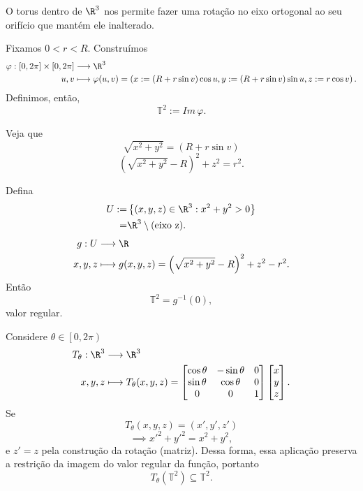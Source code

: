\begin{eg}
    O torus dentro de $\R^{3}$ nos permite fazer uma rotação no eixo ortogonal ao seu orifício que mantém ele inalterado.

    Fixamos $0<r<R$. Construímos
    \begin{align*}
        \varphi : \left[ 0, 2\pi \right] \times \left[ 0,2\pi \right]  &\longrightarrow \R^{3} \\
	u,v &\longmapsto \varphi (u,v) = \left( x:=(R + r\sin v)\cos u, y:=\left( R+r\sin v \right) \sin u,z:= r\cos v \right) 
    .\end{align*}
    Definimos, então, \[
    \mathbb{T}^2 := Im\, \varphi 
    .\] 

    Veja que \[
    \sqrt{ x^2+y^2} = \left( R+r\sin v \right)
    \] \[
    \left( \sqrt{ x^2+y^2} - R \right)^2 + z^2  = r^2
    .\] 

    Defina
    \begin{align*}
	U :=& \left\{ \left( x,y,z \right) \in \R^{3}: x^2+y^2 > 0 \right\} \\
	=& \R^{3}\setminus \text{(eixo z)}
    .\end{align*}
    \begin{align*}
        g: U &\longrightarrow \R \\
        x,y,z &\longmapsto g(x,y,z) = \left( \sqrt{ x^2+y^2} - R \right)^2 + z^2  - r^2
    .\end{align*}
    Então \[
    \mathbb{T}^2 = g^{-1}\left( 0 \right) 
    ,\] valor regular.

    Considere $\theta \in \left[ 0, 2\pi \right)$
    \begin{align*}
        T_{\theta}: \R^3 &\longrightarrow \R^{3} \\
        x,y,z &\longmapsto T_{\theta}(x,y,z) = \begin{bmatrix} 
	    \cos\theta & -\sin\theta & 0 \\
	    \sin\theta & \cos\theta & 0 \\
	    0 & 0 & 1
	\end{bmatrix} \begin{bmatrix} x \\ y \\ z \end{bmatrix} 
    .\end{align*}
    Se \[
    T_{\theta}\left( x,y,z \right) = \left( x', y', z' \right) 
    \] \[
    \implies x'^2 + y'^2 = x^2 + y^2
    ,\] e $z' = z$ pela construção da rotação (matriz). Dessa forma, essa aplicação preserva a restrição da imagem do valor regular da função, portanto \[
    T_{\theta}\left( \mathbb{T}^2 \right) \subseteq \mathbb{T}^2
    .\] 
\end{eg}

